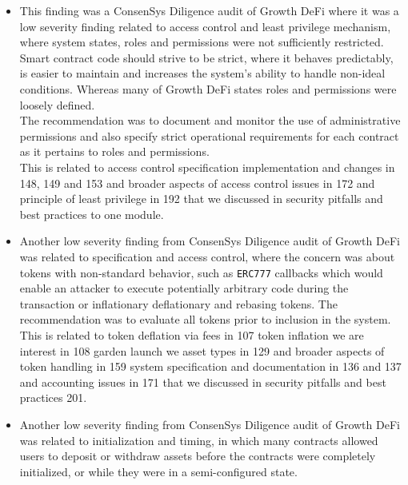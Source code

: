\begin{itemize}
\item
  This finding was a ConsenSys Diligence audit of Growth DeFi where it
  was a low severity finding related to access control and least
  privilege mechanism, where system states, roles and permissions were
  not sufficiently restricted.\\

  Smart contract code should strive to be strict, where it behaves
  predictably, is easier to maintain and increases the system's ability
  to handle non-ideal conditions. Whereas many of Growth DeFi states
  roles and permissions were loosely defined.\\

  The recommendation was to document and monitor the use of
  administrative permissions and also specify strict operational
  requirements for each contract as it pertains to roles and
  permissions.\\

  This is related to access control specification implementation and
  changes in 148, 149 and 153 and broader aspects of access control
  issues in 172 and principle of least privilege in 192 that we
  discussed in security pitfalls and best practices to one module.
\item
  Another low severity finding from ConsenSys Diligence audit of Growth
  DeFi was related to specification and access control, where the
  concern was about tokens with non-standard behavior, such as
  \texttt{ERC777} callbacks which would enable an attacker to execute
  potentially arbitrary code during the transaction or inflationary
  deflationary and rebasing tokens. The recommendation was to evaluate
  all tokens prior to inclusion in the system.\\

  This is related to token deflation via fees in 107 token inflation we
  are interest in 108 garden launch we asset types in 129 and broader
  aspects of token handling in 159 system specification and
  documentation in 136 and 137 and accounting issues in 171 that we
  discussed in security pitfalls and best practices 201.
\item
  Another low severity finding from ConsenSys Diligence audit of Growth
  DeFi was related to initialization and timing, in which many contracts
  allowed users to deposit or withdraw assets before the contracts were
  completely initialized, or while they were in a semi-configured
  state.\\


\end{itemize}
